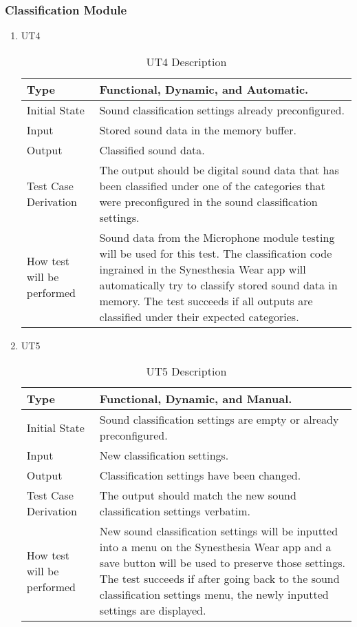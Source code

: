 \documentclass[12pt, titlepage]{article}
\begin{document}
\subsubsection{Classification Module}

\begin{enumerate}

\item{UT4}
\begin{table}[H]
    \caption{UT4 Description}
\begin{tabular}{ |p{5cm}||p{7cm}| }
    \hline
    Type & Functional, Dynamic, and Automatic. \\
    \hline
    Initial State  &  Sound classification settings already preconfigured.\\
    \hline
    Input &   Stored sound data in the memory buffer.  \\
    \hline
    Output &   Classified sound data.  \\
    \hline
    Test Case Derivation &   The output should be digital sound data that has been classified under one of the categories that were preconfigured in the sound classification settings.\\
    \hline
    How test will be performed & Sound data from the Microphone module testing will be used for this test. The classification code ingrained in the Synesthesia Wear app will automatically try to classify stored sound data in memory. The test succeeds if all outputs are classified under their expected categories.\\
    \hline
\end{tabular}
\end{table}
\item{UT5}
\begin{table}[H]
    \caption{UT5 Description}
\begin{tabular}{ |p{5cm}||p{7cm}| }
    \hline
    Type & Functional, Dynamic, and Manual. \\
    \hline
    Initial State  &  Sound classification settings are empty or already preconfigured. \\
    \hline
    Input &   New classification settings.  \\
    \hline
    Output &   Classification settings have been changed.  \\
    \hline
    Test Case Derivation &   The output should match the new sound classification settings verbatim.\\
    \hline
    How test will be performed & New sound classification settings will be inputted into a menu on the Synesthesia Wear app and a save button will be used to preserve those settings. The test succeeds if after going back to the sound classification settings menu, the newly inputted settings are displayed.\\
    \hline
\end{tabular}
\end{table}
\end{enumerate}
\end{document}
